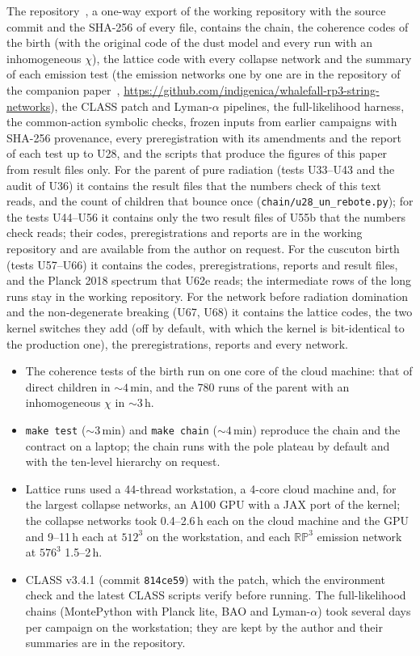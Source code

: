 \documentclass[11pt,a4paper]{article}
\newcommand{\RP}{\mathbb{RP}^3}
\begin{document}
The repository~\cite{whalefall_chain}, a one-way export of the working repository with the source commit and the SHA-256 of every file, contains the chain, the coherence codes of the birth (with the original code of the dust model and every run with an inhomogeneous $\chi$), the lattice code with every collapse network and the summary of each emission test (the emission networks one by one are in the repository of the companion paper~\cite{rp3_paper}, \url{https://github.com/indigenica/whalefall-rp3-string-networks}), the CLASS patch and Lyman-$\alpha$ pipelines, the full-likelihood harness, the common-action symbolic checks, frozen inputs from earlier campaigns with SHA-256 provenance, every preregistration with its amendments and the report of each test up to U28, and the scripts that produce the figures of this paper from result files only.
For the parent of pure radiation (tests U33--U43 and the audit of U36) it contains the result files that the numbers check of this text reads, and the count of children that bounce once (\texttt{chain/u28\_un\_rebote.py}); for the tests U44--U56 it contains only the two result files of U55b that the numbers check reads; their codes, preregistrations and reports are in the working repository and are available from the author on request. For the cuscuton birth (tests U57--U66) it contains the codes, preregistrations, reports and result files, and the Planck 2018 spectrum that U62e reads; the intermediate rows of the long runs stay in the working repository. For the network before radiation domination and the non-degenerate breaking (U67, U68) it contains the lattice codes, the two kernel switches they add (off by default, with which the kernel is bit-identical to the production one), the preregistrations, reports and every network.
\begin{itemize}
\item The coherence tests of the birth run on one core of the cloud machine: that of direct children in $\sim4$\,min, and the $780$ runs of the parent with an inhomogeneous $\chi$ in $\sim3$\,h.
\item \texttt{make test} ($\sim3$\,min) and \texttt{make chain} ($\sim4$\,min) reproduce the chain and the contract on a laptop; the chain runs with the pole plateau by default and with the ten-level hierarchy on request.
\item Lattice runs used a 44-thread workstation, a 4-core cloud machine and, for the largest collapse networks, an A100 GPU with a JAX port of the kernel; the collapse networks took 0.4--2.6\,h each on the cloud machine and the GPU and 9--11\,h each at $512^3$ on the workstation, and each $\RP$ emission network at $576^3$ 1.5--2\,h.
\item CLASS v3.4.1 (commit \texttt{814ce59}) with the patch, which the environment check and the latest CLASS scripts verify before running. The full-likelihood chains (MontePython with Planck lite, BAO and Lyman-$\alpha$) took several days per campaign on the workstation; they are kept by the author and their summaries are in the repository.
\end{itemize}
\end{document}
